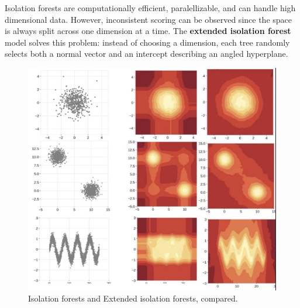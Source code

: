 Isolation forests are computationally efficient, paralellizable, and can handle high dimensional data. However, inconsistent scoring can be observed since the space is always split across one dimension at a time. The \textbf{extended isolation forest} model solves this problem: instead of choosing a dimension, each tree randomly selects both a normal vector and an intercept describing an angled hyperplane.
\clearpage
\begin{figure}[ht]
    \centering
    \includegraphics[width=0.5\linewidth]{img/isolation_forests.png}
    \caption{Isolation forests and Extended isolation forests, compared.}
    \label{fig:isolation-forests}
\end{figure}
